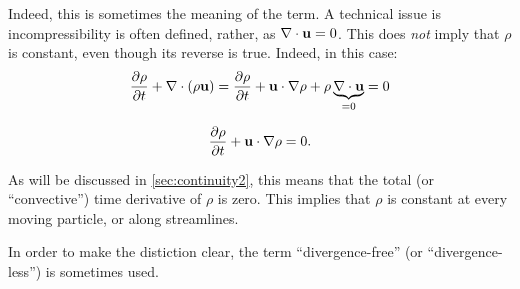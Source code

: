 Indeed, this is sometimes the meaning of the term.  A technical issue
is incompressibility is often defined, rather, as
$\nabla \cdot \mathbf{u} = 0 $. This does \emph{not} imply that $\rho$ is
constant, even though its reverse is true. Indeed, in this case:
\[
\frac{\partial \rho }{\partial t} +  \nabla \cdot (\rho \mathbf{u} ) =
\frac{\partial \rho }{\partial t} +   \mathbf{u} \cdot \nabla \rho
+ \rho \underbrace{\nabla \cdot \mathbf{u}}_{=0} = 0
\]

\[
\frac{\partial \rho }{\partial t} +   \mathbf{u} \cdot \nabla \rho = 0 .
\]

As will be discussed in \ref{sec:continuity2}, this means that the
total (or ``convective'') time derivative of $\rho$ is zero. This
implies that $\rho$ is constant at every moving particle, or along
streamlines.

In order to make the distiction clear, the term ``divergence-free'' (or
``divergence-less'') is sometimes used.
